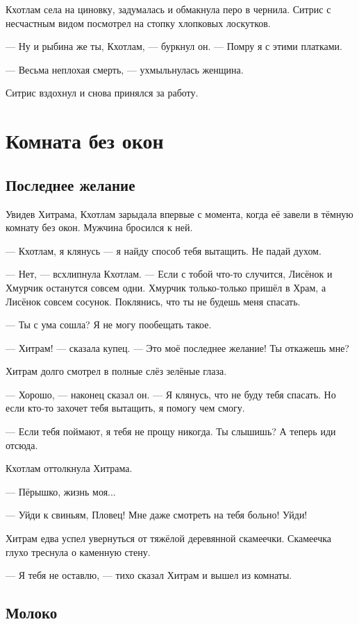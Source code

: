 Кхотлам села на циновку, задумалась и обмакнула перо в чернила.
Ситрис с несчастным видом посмотрел на стопку хлопковых лоскутков.

--- Ну и рыбина же ты, Кхотлам, --- буркнул он.
--- Помру я с этими платками.

--- Весьма неплохая смерть, --- ухмыльнулась женщина.

Ситрис вздохнул и снова принялся за работу.

\chapter{Комната без окон}

\section{Последнее желание}

Увидев Хитрама, Кхотлам зарыдала впервые с момента, когда её завели в тёмную комнату без окон.
Мужчина бросился к ней.

--- Кхотлам, я клянусь --- я найду способ тебя вытащить.
Не падай духом.

--- Нет, --- всхлипнула Кхотлам.
--- Если с тобой что-то случится, Лисёнок и Хмурчик останутся совсем одни.
Хмурчик только-только пришёл в Храм, а Лисёнок совсем сосунок.
Поклянись, что ты не будешь меня спасать.

--- Ты с ума сошла?
Я не могу пообещать такое.

--- Хитрам! --- сказала купец.
--- Это моё последнее желание!
Ты откажешь мне?

Хитрам долго смотрел в полные слёз зелёные глаза.

--- Хорошо, --- наконец сказал он.
--- Я клянусь, что не буду тебя спасать.
Но если кто-то захочет тебя вытащить, я помогу чем смогу.

--- Если тебя поймают, я тебя не прощу никогда.
Ты слышишь?
А теперь иди отсюда.

Кхотлам оттолкнула Хитрама.

--- Пёрышко, жизнь моя...

--- Уйди к свиньям, Пловец!
Мне даже смотреть на тебя больно!
Уйди!

Хитрам едва успел увернуться от тяжёлой деревянной скамеечки.
Скамеечка глухо треснула о каменную стену.

--- Я тебя не оставлю, --- тихо сказал Хитрам и вышел из комнаты.

\section{Молоко}

